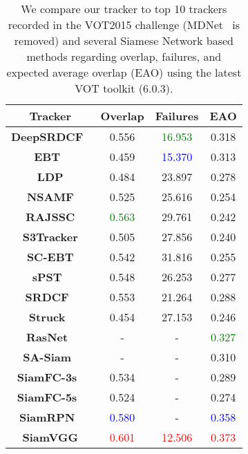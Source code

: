 \documentclass[runningheads]{llncs}
\begin{document}
\setlength{\tabcolsep}{20pt}
\begin{table}
\begin{center}
\caption{We compare our tracker to top 10 trackers recorded in the VOT2015 challenge (MDNet~\cite{nam2016learning} is removed) and several Siamese Network based methods regarding overlap, failures, and expected average overlap (EAO) using the latest VOT toolkit (6.0.3).}
\label{table:vot2015}
\begin{tabular}{cccc}
\hline


\textbf{Tracker}&\textbf{Overlap} & \textbf{Failures} & \textbf{EAO} \\\hline

\textbf{DeepSRDCF~\cite{danelljan2015convolutional}} & 0.556 & \textcolor{green}{16.953} & 0.318\\
\textbf{EBT~\cite{zhu2015tracking}} & 0.459 & \textcolor{blue}{15.370} & 0.313 \\
\textbf{LDP} & 0.484 & 23.897 & 0.278  \\
\textbf{NSAMF} & 0.525 & 25.616 & 0.254 \\
\textbf{RAJSSC} & \textcolor{green}{0.563} & 29.761 & 0.242\\
\textbf{S3Tracker} & 0.505 & 27.856 & 0.240\\
\textbf{SC-EBT} &0.542 & 31.816 & 0.255  \\
\textbf{sPST~\cite{hua2015online}} & 0.548 & 26.253 & 0.277  \\
\textbf{SRDCF~\cite{danelljan2015learning}} & 0.553 & 21.264 & 0.288  \\
\textbf{Struck~\cite{hare2016struck}} & 0.454 & 27.153 & 0.246  \\\hline


\textbf{RasNet~\cite{wang2018learning}} & - & - & \textcolor{green}{0.327}  \\



\textbf{SA-Siam~\cite{he2018twofold}} & - & - & 0.310  \\



\textbf{SiamFC-3s~\cite{bertinetto2016fully}} & 0.534 & - & 0.289  \\

\textbf{SiamFC-5s~\cite{bertinetto2016fully}} & 0.524 & - & 0.274  \\

\textbf{SiamRPN~\cite{li2018high}} &\textcolor{blue}{ 0.580} & - & \textcolor{blue}{0.358}  \\\hline

\textbf{SiamVGG} &\textcolor{red}{0.601} & \textcolor{red}{12.506} & \textcolor{red}{0.373}\\\hline

\end{tabular}
\end{center}
\end{table}
\setlength{\tabcolsep}{1.4pt}
\end{document}
